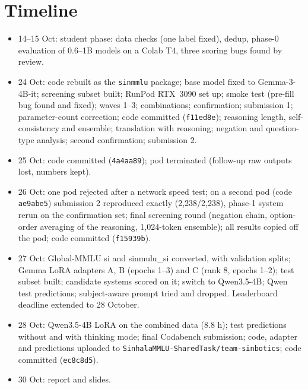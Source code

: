 \documentclass[10pt,a4paper]{article}
\begin{document}
\section{Timeline}
\begin{itemize}
\item 14--15 Oct: student phase: data checks (one label fixed), dedup, phase-0 evaluation of 0.6--1B models on a
Colab T4, three scoring bugs found by review.
\item 24 Oct: code rebuilt as the \texttt{sinmmlu} package; base model fixed to Gemma-3-4B-it; screening subset built;
RunPod RTX~3090 set up; smoke test (pre-fill bug found and fixed); waves 1--3; combinations; confirmation;
submission 1; parameter-count correction; code committed (\texttt{f11ed8e}); reasoning length, self-consistency and
ensemble; translation with reasoning; negation and question-type analysis; second confirmation; submission 2.
\item 25 Oct: code committed (\texttt{4a4aa89}); pod terminated (follow-up raw outputs lost, numbers kept).
\item 26 Oct: one pod rejected after a network speed test; on a second pod (code \texttt{ae9abe5}) submission 2
reproduced exactly (2,238/2,238), phase-1 system rerun on the confirmation set; final screening round (negation chain,
option-order averaging of the reasoning, 1,024-token ensemble); all results copied off the pod; code committed
(\texttt{f15939b}).
\item 27 Oct: Global-MMLU si and sinmulu\_si converted, with validation splits; Gemma LoRA adapters A, B (epochs
1--3) and C (rank 8, epochs 1--2); test subset built; candidate systems scored on it; switch to Qwen3.5-4B; Qwen
test predictions; subject-aware prompt tried and dropped. Leaderboard deadline extended to 28 October.
\item 28 Oct: Qwen3.5-4B LoRA on the combined data (8.8 h); test predictions without and with thinking mode; final
Codabench submission; code, adapter and predictions uploaded to \texttt{SinhalaMMLU-SharedTask/team-sinbotics};
code committed (\texttt{ec8c8d5}).
\item 30 Oct: report and slides.
\end{itemize}
\end{document}
